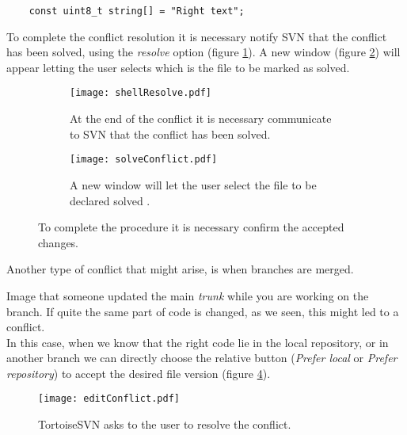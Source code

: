 \begin{verbatim}
    const uint8_t string[] = "Right text";
\end{verbatim}


To complete the conflict resolution it is necessary notify SVN that the conflict has been solved, using the \textit{resolve} option (figure \ref{fig:shellResolve}). A new window (figure \ref{fig:solveConflict}) will appear letting the user selects which is the file to be marked as solved.\newline

\begin{figure}[htbp]
\begin{subfigure}{0.5\textwidth}
  \centering
  \texttt{[image: shellResolve.pdf]}
  \caption{At the end of the conflict it is necessary communicate to SVN that the conflict has been solved.}
  \label{fig:shellResolve}
\end{subfigure}%
\begin{subfigure}{0.5\textwidth}
  \centering
  \texttt{[image: solveConflict.pdf]}
  \caption{A new window will let the user select the file to be declared solved .}
  \label{fig:solveConflict}
\end{subfigure}
\caption{To complete the procedure it is necessary confirm the accepted changes.}
\label{fig:solveConflicts}
\end{figure}

Another type of conflict that might arise, is when branches are merged.

Image that someone updated the main \textit{trunk} while you are working on the branch. If quite the same part of code is changed, as we seen, this might led to a conflict.\\


In this case, when we know that the right code lie in the local repository, or in another branch we can directly choose the relative button (\textit{Prefer local} or \textit{Prefer repository}) to accept the desired file version (figure \ref{fig:editConflict}).\\


\begin{figure}[ht!]
    \centering
    \texttt{[image: editConflict.pdf]}
    \caption{TortoiseSVN asks to the user to resolve the conflict.}
    \label{fig:editConflict}
\end{figure}


